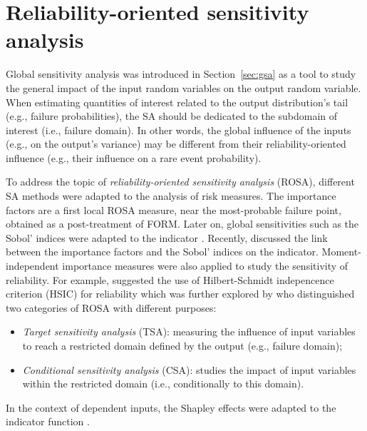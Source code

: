 \section{Reliability-oriented sensitivity analysis}

Global sensitivity analysis was introduced in Section~\ref{sec:gsa} as a tool to study the general impact of the input random variables on the output random variable. 
When estimating quantities of interest related to the output distribution's tail (e.g., failure probabilities), the SA should be dedicated to the subdomain of interest (i.e., failure domain). 
In other words, the global influence of the inputs (e.g., on the output's variance) may be different from their reliability-oriented influence (e.g., their influence on a rare event probability). 

To address the topic of \textit{reliability-oriented sensitivity analysis} (ROSA), different SA methods were adapted to the analysis of risk measures. 
The importance factors are a first local ROSA measure, near the most-probable failure point, obtained as a post-treatment of FORM. 
Later on, global sensitivities such as the Sobol' indices were adapted to the indicator \citet{wei_2012_rosa,chabridon_2018_thesis,perrin_2019_rosa}. 
Recently, \citet{papaioannou_2021_rosa_form} discussed the link between the importance factors and the Sobol' indices on the indicator. 
Moment-independent importance measures were also applied to study the sensitivity of reliability. 
For example, \citet{daveiga_2015} suggested the use of Hilbert-Schmidt indepencence criterion (HSIC) for reliability which was further explored by \citet{marrel_chabridon_2021} who distinguished two categories of ROSA with different purposes: 
\begin{itemize}
    \item \textit{Target sensitivity analysis} (TSA): measuring the influence of input variables to reach a restricted domain defined by the output (e.g., failure domain);
    \item \textit{Conditional sensitivity analysis} (CSA): studies the impact of input variables within the restricted domain (i.e., conditionally to this domain).
\end{itemize}
In the context of dependent inputs, the Shapley effects were adapted to the indicator function \citep{ilidrissi_2021_rosa,demange_2023_ijuq}. 

